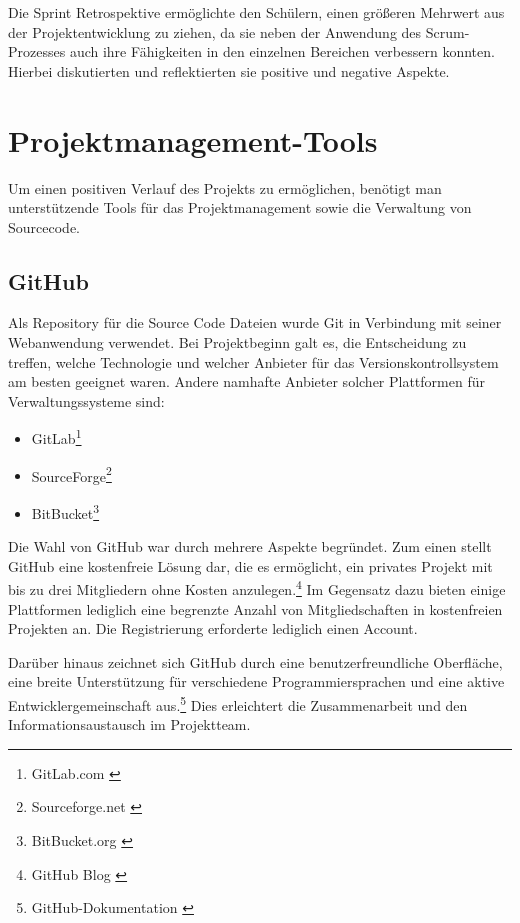 Die Sprint Retrospektive ermöglichte den Schülern, einen größeren Mehrwert aus der Projektentwicklung zu ziehen, da sie
neben der Anwendung des Scrum-Prozesses auch ihre Fähigkeiten in den einzelnen Bereichen verbessern konnten. Hierbei
diskutierten und reflektierten sie positive und negative Aspekte.

\section{Projektmanagement-Tools}
Um einen positiven Verlauf des Projekts zu ermöglichen, benötigt man unterstützende
Tools für das Projektmanagement sowie die Verwaltung von Sourcecode.

\subsection{GitHub}
Als Repository für die Source Code Dateien wurde Git in Verbindung mit seiner Webanwendung verwendet. Bei Projektbeginn
galt es, die Entscheidung zu treffen, welche Technologie und welcher Anbieter für das Versionskontrollsystem am besten
geeignet waren.
Andere namhafte Anbieter solcher Plattformen für Verwaltungssysteme sind:
\begin{itemize}
    \item GitLab\footnote{GitLab.com \cite{GitLab Website}}
    \item SourceForge\footnote{Sourceforge.net \cite{SourceForge Website}}
    \item BitBucket\footnote{BitBucket.org \cite{BitBucket Website}}
\end{itemize}

Die Wahl von GitHub war durch mehrere Aspekte begründet. Zum einen stellt GitHub eine kostenfreie Lösung dar, die es
ermöglicht, ein privates Projekt mit bis zu drei Mitgliedern ohne Kosten anzulegen.\footnote{GitHub Blog \cite{Repositories und Mitglieder}} Im Gegensatz dazu bieten einige Plattformen
lediglich eine begrenzte Anzahl von Mitgliedschaften in kostenfreien Projekten an. Die Registrierung erforderte lediglich
einen Account.

Darüber hinaus zeichnet sich GitHub durch eine benutzerfreundliche Oberfläche, eine breite Unterstützung für verschiedene
Programmiersprachen und eine aktive Entwicklergemeinschaft aus.\footnote{GitHub-Dokumentation \cite{GitHub Sprachunterstuetzung}} Dies erleichtert die Zusammenarbeit und den Informationsaustausch
im Projektteam.

